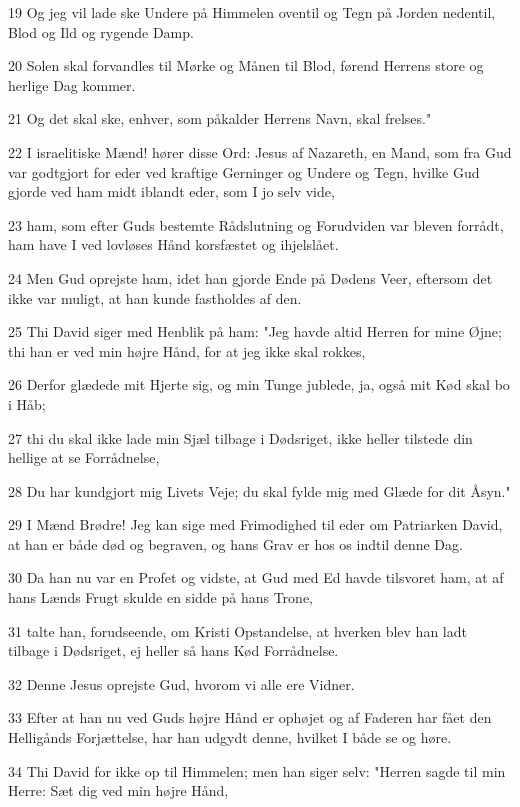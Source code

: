\par 19 Og jeg vil lade ske Undere på Himmelen oventil og Tegn på Jorden nedentil, Blod og Ild og rygende Damp.
\par 20 Solen skal forvandles til Mørke og Månen til Blod, førend Herrens store og herlige Dag kommer.
\par 21 Og det skal ske, enhver, som påkalder Herrens Navn, skal frelses."
\par 22 I israelitiske Mænd! hører disse Ord: Jesus af Nazareth, en Mand, som fra Gud var godtgjort for eder ved kraftige Gerninger og Undere og Tegn, hvilke Gud gjorde ved ham midt iblandt eder, som I jo selv vide,
\par 23 ham, som efter Guds bestemte Rådslutning og Forudviden var bleven forrådt, ham have I ved lovløses Hånd korsfæstet og ihjelslået.
\par 24 Men Gud oprejste ham, idet han gjorde Ende på Dødens Veer, eftersom det ikke var muligt, at han kunde fastholdes af den.
\par 25 Thi David siger med Henblik på ham: "Jeg havde altid Herren for mine Øjne; thi han er ved min højre Hånd, for at jeg ikke skal rokkes,
\par 26 Derfor glædede mit Hjerte sig, og min Tunge jublede, ja, også mit Kød skal bo i Håb;
\par 27 thi du skal ikke lade min Sjæl tilbage i Dødsriget, ikke heller tilstede din hellige at se Forrådnelse,
\par 28 Du har kundgjort mig Livets Veje; du skal fylde mig med Glæde for dit Åsyn."
\par 29 I Mænd Brødre! Jeg kan sige med Frimodighed til eder om Patriarken David, at han er både død og begraven, og hans Grav er hos os indtil denne Dag.
\par 30 Da han nu var en Profet og vidste, at Gud med Ed havde tilsvoret ham, at af hans Lænds Frugt skulde en sidde på hans Trone,
\par 31 talte han, forudseende, om Kristi Opstandelse, at hverken blev han ladt tilbage i Dødsriget, ej heller så hans Kød Forrådnelse.
\par 32 Denne Jesus oprejste Gud, hvorom vi alle ere Vidner.
\par 33 Efter at han nu ved Guds højre Hånd er ophøjet og af Faderen har fået den Helligånds Forjættelse, har han udgydt denne, hvilket I både se og høre.
\par 34 Thi David for ikke op til Himmelen; men han siger selv: "Herren sagde til min Herre: Sæt dig ved min højre Hånd,
